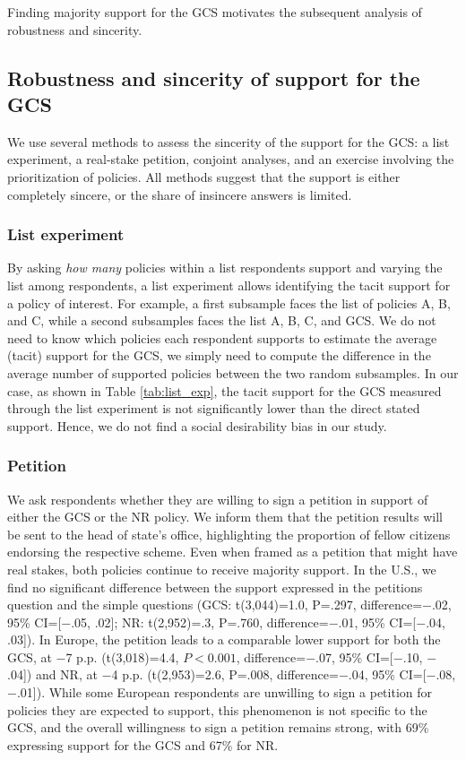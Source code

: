 \documentclass[12pt,english]{article}
\begin{document}
Finding majority support for the GCS %
motivates the subsequent analysis of robustness and sincerity. %
\subsection{Robustness and sincerity of support for the GCS}\label{subsec:robustness_sincerity}
We use several methods to assess the sincerity of the support for the GCS: a list experiment, a real-stake petition, conjoint analyses, and an exercise involving the prioritization of policies. All methods suggest that the support is either completely sincere, or the share of insincere answers is limited. 

\subsubsection{List experiment}\label{subsubsec:list_exp} %

By asking \textit{how many} policies within a list respondents support and varying the list among respondents, a list experiment allows identifying the tacit support for a policy of interest. 
For example, a first subsample faces the list of policies A, B, and C, while a second subsamples faces the list A, B, C, and GCS. We do not need to know which policies each respondent supports to estimate the average (tacit) support for the GCS, we simply need to compute the difference in the average number of supported policies between the two random subsamples.\citep{imai_multivariate_2011} 
In our case, as shown in Table \ref{tab:list_exp}, the tacit support for the GCS measured through the list experiment is not significantly lower than the direct stated support. %
Hence, we do not find a social desirability bias in our study.

\subsubsection{Petition}\label{subsubsec:petition} %

We ask respondents whether they are willing to sign a petition in support of either the GCS or the NR policy. We inform them that the petition results will be sent to the head of state's office, highlighting the proportion of fellow citizens endorsing the respective scheme. Even when framed as a petition that might have real stakes, both policies continue to receive majority support. In the U.S., we find no significant difference between the support expressed in the %
petitions question and the simple questions (GCS: t(3,044)=1.0, P=.297, difference=$-$.02, 95\% CI=[$-$.05, .02]; NR: t(2,952)=.3, P=.760, difference=$-$.01, 95\% CI=[$-$.04, .03]). 
In Europe, the petition leads to a comparable lower support for both the GCS, at $-$7 p.p. (t(3,018)=4.4, $P<0.001$, difference=$-$.07, 95\% CI=[$-$.10, $-$.04]) and NR, at $-$4 p.p. (t(2,953)=2.6, P=.008, difference=$-$.04, 95\% CI=[$-$.08, $-$.01]). 
While some European respondents are unwilling to sign a petition for policies they are expected to support, this phenomenon is not specific to the GCS, and the overall willingness to sign a %
petition remains strong, with 69\% expressing support for the GCS and 67\% for NR.
\end{document}
